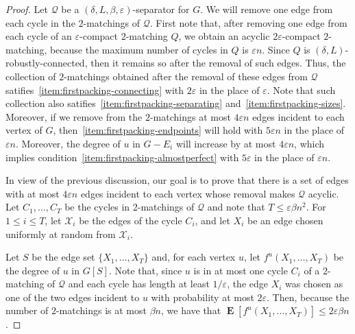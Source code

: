 \documentclass[a4paper, 11pt,reqno]{amsart}
\newcommand{\calQ}{\mathcal{Q}}
\newcommand{\calX}{\mathcal{X}}
\theoremstyle{plain}
\theoremstyle{definition}
\numberwithin{equation}{section}
\DeclareMathOperator{\expectation}{\mathbf{E}}
\newcommand{\eps}{\varepsilon}
\begin{document}
\begin{proof}
	Let $\mathcal{Q}$ be a $(\delta, L,\beta,\eps)$-separator for $G$.
  We will remove one edge from each cycle in the $2$-matchings of
  $\calQ$. First note that, after removing one edge from each cycle of
  an $\eps$-compact $2$-matching $Q$, we obtain an acyclic
  $2\eps$-compact $2$-matching, because the maximum number of cycles
  in $Q$ is $\eps n$. Since $Q$ is $(\delta,L)$-robustly-connected,
  then it remains so after the removal of such edges. Thus, the
  collection of $2$-matchings obtained after the removal of these
  edges from $\calQ$ satifies~\ref{item:firstpacking-connecting} with
  $2\eps$ in the place of $\eps$.  Note that such collection also
  satifies~\ref{item:firstpacking-separating}
  and~\ref{item:firstpacking-sizes}.  Moreover, if we remove from the
  $2$-matchings at most $4\eps n$ edges incident to each vertex of
  $G$, then~\ref{item:firstpacking-endpoints} will hold with $5\eps n$
  in the place of $\eps n$.  Moreover, the degree of $u$ in $G-E_i$
  will increase by at most $4\eps n$, which implies
  condition~\ref{item:firstpacking-almostperfect} with $5\eps$ in
  the place of $\eps n$.
  
  In view of the previous discussion, our goal is to prove that there
  is a set of edges with at most $4\eps n$ edges incident to each
  vertex whose removal makes $\calQ$ acyclic.
  Let $C_1,\ldots,C_T$ be the cycles in 2-matchings of $\calQ$ and
  note that $T \leq \eps \beta n^2$. 
  For $1 \leq i \leq T$, let $\calX_i$ be the edges of the cycle $C_i$, 
  and let $X_i$ be an edge chosen uniformly at random from $\calX_i$.
  
  Let $S$ be the edge set $\{X_1,\ldots,X_T\}$ and, for each vertex
  $u$, let $f^u(X_1,\ldots,X_T)$ be the degree of $u$ in $G[S]$.  Note
  that, since $u$ is in at most one cycle $C_i$ of a $2$-matching of
  $\calQ$ and each cycle has length at least $1/\eps$, the edge $X_i$
  was chosen as one of the two edges incident to $u$ with probability
  at most $2\eps$. Then, because the number of $2$-matchings is at most
  $\beta n$, we have that $\expectation[f^u(X_1,\ldots,X_T)] \leq
  2\eps\beta n$.
  

\end{proof}
\end{document}
